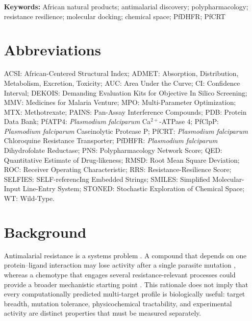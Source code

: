 \documentclass[11pt,a4paper]{article}
\begin{document}
\noindent\textbf{Keywords:} African natural products; antimalarial discovery; polypharmacology; resistance resilience; molecular docking; chemical space; PfDHFR; PfCRT

\section*{Abbreviations}
\noindent ACSI: African-Centered Structural Index; ADMET: Absorption, Distribution, Metabolism, Excretion, Toxicity; AUC: Area Under the Curve; CI: Confidence Interval; DEKOIS: Demanding Evaluation Kits for Objective In Silico Screening; MMV: Medicines for Malaria Venture; MPO: Multi-Parameter Optimization; MTX: Methotrexate; PAINS: Pan-Assay Interference Compounds; PDB: Protein Data Bank; PfATP4: \emph{Plasmodium falciparum} Ca$^{2+}$-ATPase 4; PfClpP: \emph{Plasmodium falciparum} Caseinolytic Protease P; PfCRT: \emph{Plasmodium falciparum} Chloroquine Resistance Transporter; PfDHFR: \emph{Plasmodium falciparum} Dihydrofolate Reductase; PNS: Polypharmacology Network Score; QED: Quantitative Estimate of Drug-likeness; RMSD: Root Mean Square Deviation; ROC: Receiver Operating Characteristic; RRS: Resistance-Resilience Score; SELFIES: SELF-referencIng Embedded Strings; SMILES: Simplified Molecular-Input Line-Entry System; STONED: Stochastic Exploration of Chemical Space; WT: Wild-Type.


	
	
	\section{Background}\label{sec:intro}
	Antimalarial resistance is a systems problem \cite{WHO2024MalariaReport,Ariey2014,Ashley2018}. A compound that depends on one protein--ligand interaction may lose activity after a single parasite mutation \cite{Fidock2000}, whereas a chemotype that engages several resistance-relevant processes could provide a broader mechanistic starting point \cite{Wells2015,SiqueiraNeto2023,Ryszkiewicz2026MTDL,Trapotsi2022MoA}. This rationale does not imply that every computationally predicted multi-target profile is biologically useful: target breadth, mutation tolerance, physicochemical tractability, and experimental activity are distinct properties that must be measured separately.
	
\end{document}
